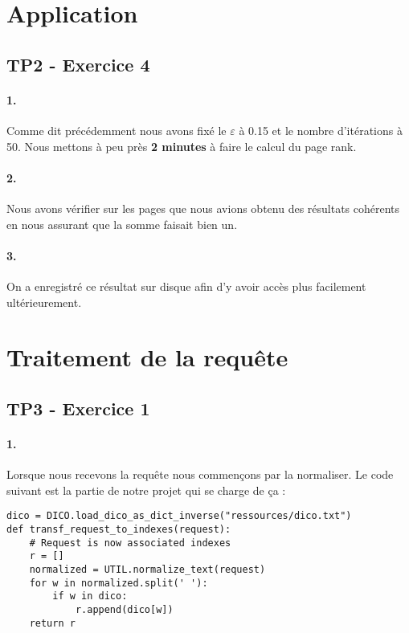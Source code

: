 \documentclass[10pt,a4paper]{article}
\begin{document}
\section{Application}
\subsection{TP2 - Exercice 4}
\paragraph{1.}Comme dit précédemment nous avons fixé le $\varepsilon$ à 0.15 et le nombre d'itérations à 50. Nous mettons à peu près \textbf{2 minutes} à faire le calcul du page rank.

\paragraph{2.}Nous avons vérifier sur les pages que nous avions obtenu des résultats cohérents en nous assurant que la somme faisait bien un.

\paragraph{3.}On a enregistré ce résultat sur disque afin d'y avoir accès plus facilement ultérieurement.




\section{Traitement de la requête}
\subsection{TP3 - Exercice 1}
\paragraph{1.} Lorsque nous recevons la requête nous commençons par la normaliser. Le code suivant est la partie de notre projet qui se charge de ça :
\begin{verbatim}
dico = DICO.load_dico_as_dict_inverse("ressources/dico.txt")
def transf_request_to_indexes(request):
    # Request is now associated indexes
    r = []
    normalized = UTIL.normalize_text(request)
    for w in normalized.split(' '):
        if w in dico:
            r.append(dico[w])
    return r
\end{verbatim}
\end{document}
